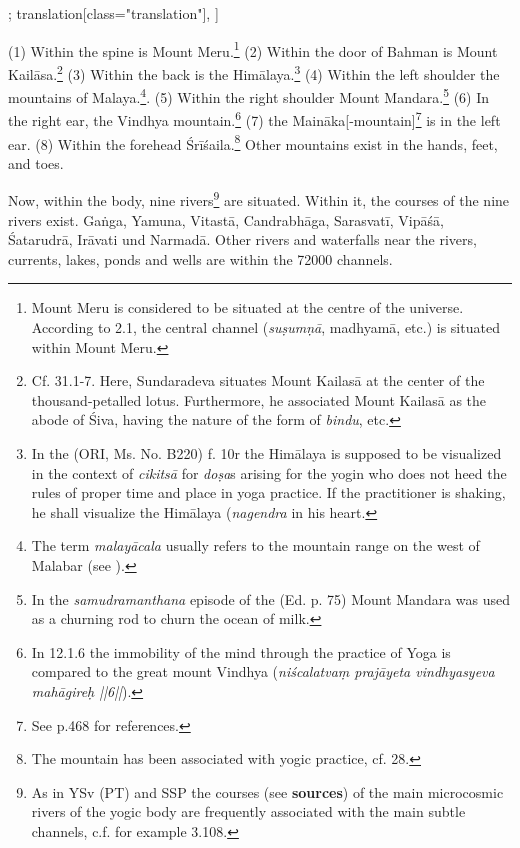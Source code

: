 \begin{alignment}[
  texts=edition[class="edition"];
  translation[class="translation"],
  ]
\begin{translation}
\begin{tlate}[p39_01]
(1) Within the spine is Mount Meru.\footnote{Mount Meru is considered to be situated at the centre of the universe. According to  2.1, the central channel (\textit{suṣumṇā}, madhyamā, etc.) is situated within Mount Meru.}  (2) Within the door of Bahman is Mount Kailāsa.\footnote{Cf.  31.1-7. Here, Sundaradeva situates Mount Kailasā at the center of the thousand-petalled lotus. Furthermore, he associated Mount Kailasā as the abode of Śiva, having the nature of the form of \textit{bindu}, etc.} (3) Within the back is the Himālaya.\footnote{In the  (ORI, Ms. No. B220) f. 10r the Himālaya is supposed to be visualized in the context of \textit{cikitsā} for \textit{doṣa}s arising for the yogin who does not heed the rules of proper time and place in yoga practice. If the practitioner is shaking, he shall visualize the Himālaya (\textit{nagendra} in his heart.} (4) Within the left shoulder the mountains of Malaya.\footnote{The term \textit{malayācala} usually refers to the mountain range on the west of Malabar (see \citeauthor[1858:37]{petersburger5}).}. (5) Within the right shoulder Mount Mandara.\footnote{In the \textit{samudramanthana} episode of the  (Ed. p. 75) Mount Mandara was used as a churning rod to churn the ocean of milk.} (6) In the right ear, the Vindhya mountain.\footnote{In  12.1.6 the immobility of the mind through the practice of Yoga is compared to the great mount Vindhya (\textit{niścalatvaṃ prajāyeta vindhyasyeva mahāgireḥ ||6||}).} (7) the Maināka[-mountain]\footnote{See  p.468 for references.} is in the left ear. (8) Within the forehead Śrīśaila.\footnote{The mountain has been associated with yogic practice, cf.  28.} Other mountains exist in the hands, feet, and toes.
\end{tlate}
\begin{tlate}[p40_01]
  Now, within the body, nine rivers\footnote{As in YSv (PT) and SSP the courses (see \textbf{sources}) of the main microcosmic rivers of the yogic body are frequently associated with the main subtle channels, c.f. for example  3.108.} are situated. Within it, the courses of the nine rivers exist. Gaṅga, Yamuna, Vitastā, Candrabhāga, Sarasvatī, Vipāśā, Śatarudrā, Irāvati und Narmadā. Other rivers and waterfalls near the rivers, currents, lakes, ponds and wells are within the 72000 channels.
\end{tlate}
  \end{translation}
\end{alignment}
